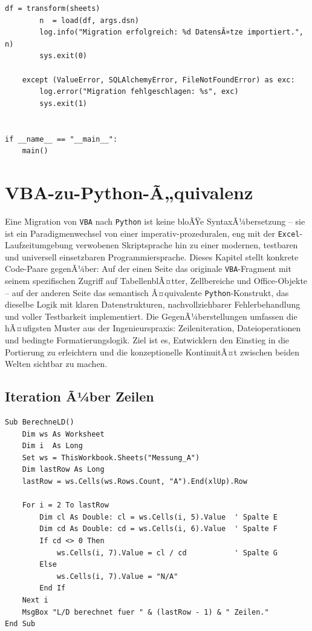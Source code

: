 ﻿\documentclass[12pt,a4paper]{report}
\theoremstyle{definition}
\theoremstyle{remark}
\newcommand{\excel}{\texttt{Excel}}
\newcommand{\vba}{\texttt{VBA}}
\newcommand{\py}{\texttt{Python}}
\begin{document}
\begin{lstlisting}[style=python, caption={migrate.py: VollstÃ¤ndige ETL-Pipeline}, label=lst:etl]
        df = transform(sheets)
        n  = load(df, args.dsn)
        log.info("Migration erfolgreich: %d DatensÃ¤tze importiert.", n)
        sys.exit(0)

    except (ValueError, SQLAlchemyError, FileNotFoundError) as exc:
        log.error("Migration fehlgeschlagen: %s", exc)
        sys.exit(1)


if __name__ == "__main__":
    main()
\end{lstlisting}

\chapter{VBA-zu-Python-Ã„quivalenz}

Eine Migration von \vba{} nach \py{} ist keine bloÃŸe SyntaxÃ¼bersetzung -- sie ist ein Paradigmenwechsel von einer imperativ-prozeduralen, eng mit der \excel{}-Laufzeitumgebung verwobenen Skriptsprache hin zu einer modernen, testbaren und universell einsetzbaren Programmiersprache. Dieses Kapitel stellt konkrete Code-Paare gegenÃ¼ber: Auf der einen Seite das originale \vba{}-Fragment mit seinem spezifischen Zugriff auf TabellenblÃ¤tter, Zellbereiche und Office-Objekte -- auf der anderen Seite das semantisch Ã¤quivalente \py{}-Konstrukt, das dieselbe Logik mit klaren Datenstrukturen, nachvollziehbarer Fehlerbehandlung und voller Testbarkeit implementiert. Die GegenÃ¼berstellungen umfassen die hÃ¤ufigsten Muster aus der Ingenieurspraxis: Zeileniteration, Dateioperationen und bedingte Formatierungslogik. Ziel ist es, Entwicklern den Einstieg in die Portierung zu erleichtern und die konzeptionelle KontinuitÃ¤t zwischen beiden Welten sichtbar zu machen.

\section{Iteration Ã¼ber Zeilen}

\begin{lstlisting}[style=vba, caption={VBA: Iteration mit For Each}]
Sub BerechneLD()
    Dim ws As Worksheet
    Dim i  As Long
    Set ws = ThisWorkbook.Sheets("Messung_A")
    Dim lastRow As Long
    lastRow = ws.Cells(ws.Rows.Count, "A").End(xlUp).Row

    For i = 2 To lastRow
        Dim cl As Double: cl = ws.Cells(i, 5).Value  ' Spalte E
        Dim cd As Double: cd = ws.Cells(i, 6).Value  ' Spalte F
        If cd <> 0 Then
            ws.Cells(i, 7).Value = cl / cd           ' Spalte G
        Else
            ws.Cells(i, 7).Value = "N/A"
        End If
    Next i
    MsgBox "L/D berechnet fuer " & (lastRow - 1) & " Zeilen."
End Sub
\end{lstlisting}
\end{document}
